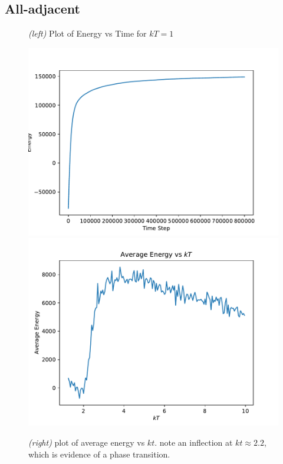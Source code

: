 \documentclass{article}
\begin{document}
\subsection*{All-adjacent}
\begin{figure}[H]
  \caption{\textit{(left)} Plot of Energy vs Time for $kT = 1$}
  \includegraphics[scale=0.35]{a_e_0.pdf}
  \includegraphics[scale=0.35]{a_avg_energy.pdf}
  \caption{\textit{(right)} plot of average energy vs $kt$.
    note an inflection at $kt \approx 2.2$, which is evidence of a
    phase transition.}
\end{figure}
\end{document}
